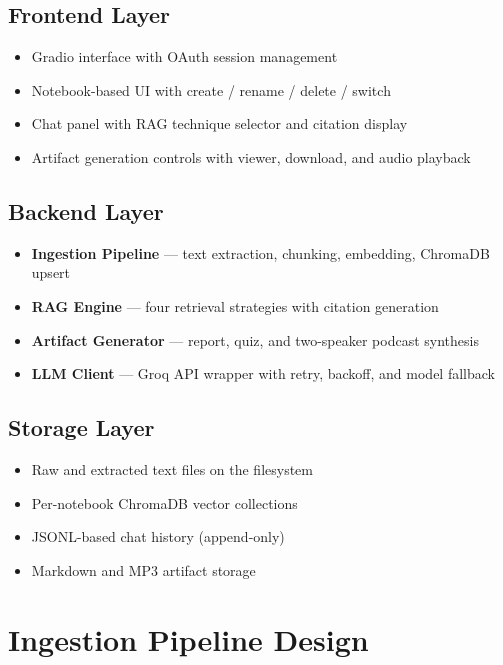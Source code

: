 \documentclass[11pt, letterpaper]{article}
\begin{document}
\subsection{Frontend Layer}

\begin{itemize}
    \item Gradio interface with OAuth session management
    \item Notebook-based UI with create / rename / delete / switch
    \item Chat panel with RAG technique selector and citation display
    \item Artifact generation controls with viewer, download, and audio playback
\end{itemize}

\subsection{Backend Layer}

\begin{itemize}
    \item \textbf{Ingestion Pipeline} --- text extraction, chunking, embedding, ChromaDB upsert
    \item \textbf{RAG Engine} --- four retrieval strategies with citation generation
    \item \textbf{Artifact Generator} --- report, quiz, and two-speaker podcast synthesis
    \item \textbf{LLM Client} --- Groq API wrapper with retry, backoff, and model fallback
\end{itemize}

\subsection{Storage Layer}

\begin{itemize}
    \item Raw and extracted text files on the filesystem
    \item Per-notebook ChromaDB vector collections
    \item JSONL-based chat history (append-only)
    \item Markdown and MP3 artifact storage
\end{itemize}

\section{Ingestion Pipeline Design}
\end{document}
